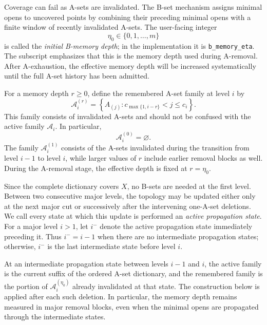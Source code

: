 \documentclass[a4paper,11pt]{article}
\theoremstyle{definition}
\theoremstyle{remark}
\begin{document}
Coverage can fail as A-sets are invalidated. The B-set mechanism assigns minimal opens to uncovered points by combining their preceding minimal opens with a finite window of recently invalidated A-sets. The user-facing integer
$$
\eta_0\in\{0,1,\ldots,m\}
$$
is called the \emph{initial B-memory depth}; in the implementation it is \texttt{b\_memory\_eta}. The subscript emphasizes that this is the memory depth used during A-removal. After A-exhaustion, the effective memory depth will be increased systematically until the full A-set history has been admitted.

For a memory depth $r\geq0$, define the remembered A-set family at level $i$ by
$$
\mathcal A_i^{(r)} = \left\{A_{(j)}\colon c_{\max\{1,i-r\}}<j\leq c_i\right\}.
$$
This family consists of invalidated A-sets and should not be confused with the active family $\mathcal A_i$. In particular,
$$
\mathcal A_i^{(0)}=\varnothing.
$$
The family $\mathcal A_i^{(1)}$ consists of the A-sets invalidated during the transition from level $i-1$ to level $i$, while larger values of $r$ include earlier removal blocks as well. During the A-removal stage, the effective depth is fixed at $r=\eta_0$.

Since the complete dictionary covers $X$, no B-sets are needed at the first level. Between two consecutive major levels, the topology may be updated either only at the next major cut or successively after the intervening one-A-set deletions. We call every state at which this update is performed an \emph{active propagation state}. For a major level $i>1$, let $i^{-}$ denote the active propagation state immediately preceding it. Thus $i^{-}=i-1$ when there are no intermediate propagation states; otherwise, $i^{-}$ is the last intermediate state before level $i$.

At an intermediate propagation state between levels $i-1$ and $i$, the active family is the current suffix of the ordered A-set dictionary, and the remembered family is the portion of $\mathcal A_i^{(\eta_0)}$ already invalidated at that state. The construction below is applied after each such deletion. In particular, the memory depth remains measured in major removal blocks, even when the minimal opens are propagated through the intermediate states.
\end{document}
